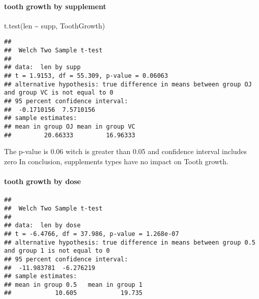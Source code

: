 \documentclass[
]{article}
\newenvironment{Shaded}{\begin{snugshade}}{\end{snugshade}}
\newcommand{\DecValTok}[1]{\textcolor[rgb]{0.00,0.00,0.81}{#1}}
\newcommand{\FloatTok}[1]{\textcolor[rgb]{0.00,0.00,0.81}{#1}}
\newcommand{\FunctionTok}[1]{\textcolor[rgb]{0.00,0.00,0.00}{#1}}
\newcommand{\NormalTok}[1]{#1}
\newcommand{\SpecialCharTok}[1]{\textcolor[rgb]{0.00,0.00,0.00}{#1}}
\begin{document}
\hypertarget{tooth-growth-by-supplement}{%
\paragraph{tooth growth by
supplement}\label{tooth-growth-by-supplement}}

\begin{Shaded}
\begin{Highlighting}[]
\FunctionTok{t.test}\NormalTok{(len }\SpecialCharTok{\textasciitilde{}}\NormalTok{ supp, ToothGrowth)}
\end{Highlighting}
\end{Shaded}

\begin{verbatim}
## 
##  Welch Two Sample t-test
## 
## data:  len by supp
## t = 1.9153, df = 55.309, p-value = 0.06063
## alternative hypothesis: true difference in means between group OJ and group VC is not equal to 0
## 95 percent confidence interval:
##  -0.1710156  7.5710156
## sample estimates:
## mean in group OJ mean in group VC 
##         20.66333         16.96333
\end{verbatim}

The p-value is 0.06 witch is greater than 0.05 and confidence interval
includes zero In conclusion, supplements types have no impact on Tooth
growth.

\hypertarget{tooth-growth-by-dose}{%
\paragraph{tooth growth by dose}\label{tooth-growth-by-dose}}

\begin{Shaded}
\end{Shaded}

\begin{verbatim}
## 
##  Welch Two Sample t-test
## 
## data:  len by dose
## t = -6.4766, df = 37.986, p-value = 1.268e-07
## alternative hypothesis: true difference in means between group 0.5 and group 1 is not equal to 0
## 95 percent confidence interval:
##  -11.983781  -6.276219
## sample estimates:
## mean in group 0.5   mean in group 1 
##            10.605            19.735
\end{verbatim}
\end{document}
